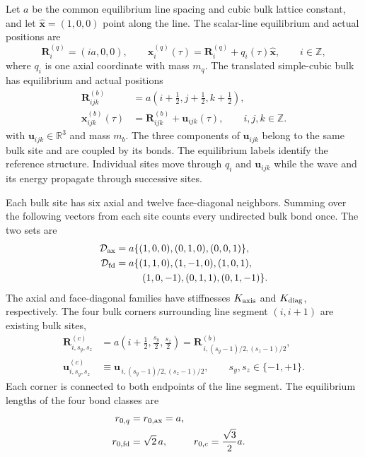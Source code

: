 \documentclass[10pt,aps,onecolumn,floatfix,notitlepage,nofootinbib,showkeys]{revtex4-2}
\newcommand{\vu}{\bm{u}}
\newcommand{\vR}{\bm{R}}
\newcommand{\vx}{\bm{x}}
\newcommand{\ex}{\hat{\bm{x}}}
\begin{document}
Let $a$ be the common equilibrium line spacing and cubic bulk lattice constant, and let $\ex=(1,0,0)$ point along the line. The scalar-line equilibrium and actual positions are
\begin{equation}
  \vR_i^{(q)}=(ia,0,0),
  \qquad
  \vx_i^{(q)}(\tau)=\vR_i^{(q)}+q_i(\tau)\ex,
  \qquad i\in\mathbb Z,
  \label{eq:s2-line-position}
\end{equation}
where $q_i$ is one axial coordinate with mass $m_q$. The translated simple-cubic bulk has equilibrium and actual positions
\begin{align}
  \vR_{ijk}^{(b)}
  &=a\left(i+\tfrac12,j+\tfrac12,k+\tfrac12\right),\\
  \vx_{ijk}^{(b)}(\tau)
  &=\vR_{ijk}^{(b)}+\vu_{ijk}(\tau),
  \qquad i,j,k\in\mathbb Z.
  \label{eq:s2-bulk-position}
\end{align}
with $\vu_{ijk}\in\mathbb R^3$ and mass $m_b$. The three components of $\vu_{ijk}$ belong to the same bulk site and are coupled by its bonds. The equilibrium labels identify the reference structure. Individual sites move through $q_i$ and $\vu_{ijk}$ while the wave and its energy propagate through successive sites.

Each bulk site has six axial and twelve face-diagonal neighbors. Summing over the following vectors from each site counts every undirected bulk bond once. The two sets are
\begin{align}
  \mathcal D_{\rm ax}
  &=a\{(1,0,0),(0,1,0),(0,0,1)\},
  \label{eq:s2-Dax}\\
  \mathcal D_{\rm fd}
  &=a\{(1,1,0),(1,-1,0),(1,0,1),\\
  &\hspace{2.7em}(1,0,-1),(0,1,1),(0,1,-1)\}.
  \label{eq:s2-Dfd}
\end{align}
The axial and face-diagonal families have stiffnesses $K_{\rm axis}$ and $K_{\rm diag}$, respectively. The four bulk corners surrounding line segment $(i,i+1)$ are existing bulk sites,
\begin{align}
  \vR_{i,s_y,s_z}^{(c)}
  &=a\left(i+\tfrac12,\tfrac{s_y}{2},\tfrac{s_z}{2}\right)
   =\vR_{\,i,(s_y-1)/2,(s_z-1)/2}^{(b)},
  \label{eq:s2-corner-position}\\
  \vu_{i,s_y,s_z}^{(c)}
  &\equiv
  \vu_{\,i,(s_y-1)/2,(s_z-1)/2},
  \qquad s_y,s_z\in\{-1,+1\}.
  \label{eq:s2-corner-displacement}
\end{align}
Each corner is connected to both endpoints of the line segment. The equilibrium lengths of the four bond classes are
\begin{equation}
\begin{aligned}
  r_{0,q}&=r_{0,\rm ax}=a,\\
  r_{0,\rm fd}&=\sqrt2\,a,
  &r_{0,c}&=\frac{\sqrt3}{2}a.
\end{aligned}
\label{eq:s2-rest-lengths}
\end{equation}
\end{document}

